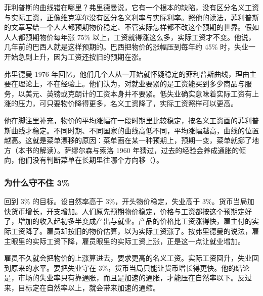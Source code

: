 菲利普斯的曲线错在哪里？弗里德曼说，它有一个根本的缺陷，没有区分名义工资与实际工资，正像维克塞尔没有区分名义利率与实际利率\cite{friedman1968}。照他的读法，菲利普斯的文章写给一个人人都预期物价稳定、不管实际怎样都不改这个预期的世界\cite{friedman1968}。假如人人都预期物价每年涨 75\% 以上，工资就得涨这么多，实际工资才不变\cite{friedman1968}。他说，几年前的巴西人就是这样预期的\cite{friedman1968}。巴西把物价的涨幅压到每年约 45\% 时，失业一开始急剧上升，因为工资还按旧的预期在涨\cite{friedman1968}。

弗里德曼 1976 年回忆，他们几个人从一开始就怀疑稳定的菲利普斯曲线，理由主要在理论上，不在经验上\cite{friedman1976}。他们认为，对就业要紧的是工资能买到多少商品与服务，以美元、英镑或克朗计的工资本身并不要紧\cite{friedman1976}。低失业确实意味着实际工资有上涨的压力，可只要物价降得更多，名义工资降了，实际工资照样可以更高\cite{friedman1976}。

他在脚注里补充，物价的平均涨幅在一段时期里比较稳定，按名义工资画的菲利普斯曲线才稳定\cite{friedman1968}。不同时期、不同国家的曲线高低不同，平均涨幅越高，曲线的位置越高\cite{friedman1968}。这就是菜单漂移的原因：菜单画在某一种预期上，预期一变，菜单就挪了地方（本书的解读）。萨缪尔森与索洛 1960 年猜过，过去的经验会养成通胀的倾向，他们没有判断菜单在长期里往哪个方向移（）。

\subsubsection{为什么守不住 3\%}

回到 3\% 的目标。设自然率高于 3\%，开头物价稳定，失业高于 3\%\cite{friedman1968}。货币当局加快货币增长，开支增加\cite{friedman1968}。人们原先预期物价稳定，价格与工资都按这个预期定好了，增加的收入起初多半变成产出与就业\cite{friedman1968}。产品的价格比工资涨得快，雇主付的实际工资降了。雇员却按旧的物价估算，以为实际工资涨了\cite{friedman1968}。按弗里德曼的说法，雇主眼里的实际工资下降，雇员眼里的实际工资上涨，正是这一点让就业增加\cite{friedman1968}。

雇员不久就会把物价的上涨算进去，要求更高的名义工资\cite{friedman1968}。实际工资回升，失业回到原来的水平\cite{friedman1968}。要把失业守在 3\%，货币当局只能让货币增长得更快\cite{friedman1968}。他的结论是，市场的失业率只有靠通胀，而且是加速的通胀，才能压在自然率以下\cite{friedman1968}。反过来，目标定在自然率以上，就会带来加速的通缩\cite{friedman1968}。

